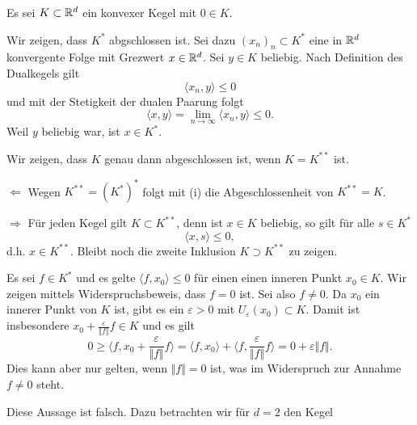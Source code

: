 
Es sei $K\subset \mathbb{R}^d$ ein konvexer Kegel mit $0\in K$.
\\
\begin{compactenum}[(i)]
 \item Wir zeigen, dass $K^*$ abgschlossen ist. Sei dazu $(x_n)_n\subset K^*$ eine in $\mathbb{R}^d$ konvergente
 Folge mit Grezwert $x\in\mathbb{R}^d$. Sei $y\in K$ beliebig. Nach Definition des Dualkegels gilt 
 \begin{displaymath}
  \langle x_n,y\rangle\leq 0
 \end{displaymath}
 und mit der Stetigkeit der dualen Paarung folgt
 \begin{displaymath}
  \langle x, y\rangle =\lim_{n\to\infty}\langle x_n,y\rangle\leq 0.
 \end{displaymath} 
 Weil $y$ beliebig war, ist $x\in K^*$.
 \\
 \item Wir zeigen, dass $K$ genau dann abgeschlossen ist, wenn $K=K^{**}$ ist.
 \begin{compactenum}
 \item[$\Leftarrow$] Wegen $K^{**}=(K^*)^*$ folgt mit (i) die Abgeschlossenheit von $K^{**}=K$.
 \item[$\Rightarrow$] Für jeden Kegel gilt $K\subset K^{**}$, denn ist $x\in K$ beliebig,
 so gilt für alle $s\in K^*$
 \begin{displaymath}
    \langle x,s\rangle\leq 0,
 \end{displaymath}
 d.h. $x\in K^{**}$. Bleibt noch die zweite Inklusion $K\supset K^{**}$ zu zeigen.
 \\
 \end{compactenum}
 \item  Es sei $f\in K^*$ und es gelte $\langle f, x_0\rangle\leq 0$ für einen einen inneren Punkt $x_0\in K$.
 Wir zeigen mittels Widerspruchsbeweis, dass $f=0$ ist. Sei also $f\neq0$. Da $x_0$ ein innerer Punkt von $K$ 
 ist, gibt es ein $\varepsilon>0$ mit $U_\varepsilon(x_0)\subset K$. Damit ist insbesondere 
 $x_0+\frac{\varepsilon}{\Vert f \Vert} f\in K$ und es gilt
 \begin{displaymath}
  0\geq \langle f,x_0+\frac{\varepsilon}{\Vert f \Vert} f\rangle
  = \langle f,x_0\rangle+\langle f,\frac{\varepsilon}{\Vert f \Vert} f\rangle
  =0+\varepsilon \Vert f\Vert.
 \end{displaymath}
 Dies kann aber nur gelten, wenn $\Vert f\Vert=0$ ist, was im Widerspruch zur Annahme $f\neq 0$ steht.
 \\
 \item Diese Aussage ist falsch. Dazu betrachten wir für $d=2$ den Kegel

\end{compactenum}
